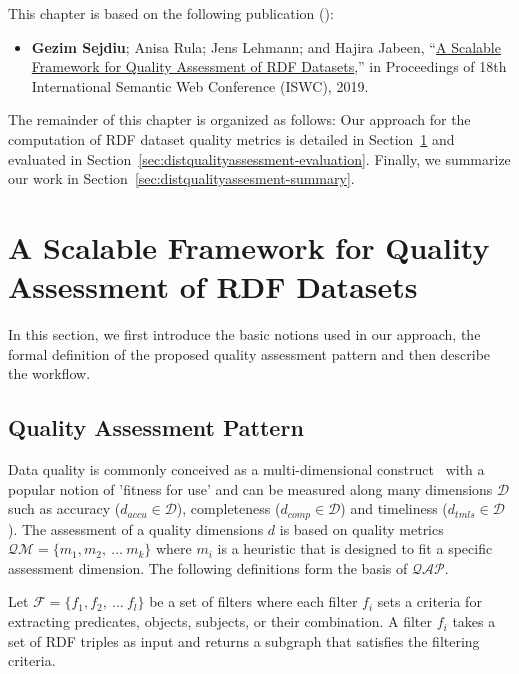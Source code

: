 This chapter is based on the following publication (\cite{sejdiu-2019-sansa-dist-quality-assessment-iswc}):
\begin{itemize}
     \item \textbf{Gezim Sejdiu}; Anisa Rula; Jens Lehmann; and Hajira Jabeen, “\href{http://jens-lehmann.org/files/2019/iswc_dist_quality_assessment.pdf}{A Scalable Framework for Quality Assessment of RDF Datasets},” in Proceedings of 18th International Semantic Web Conference (ISWC), 2019.
\end{itemize}

The remainder of this chapter is organized as follows:
Our approach for the computation of \gls{RDF} dataset quality metrics is detailed in Section~\ref{sec:distqualityassessment-approach} and evaluated in Section~\ref{sec:distqualityassessment-evaluation}.
Finally, we summarize our work in  Section~\ref{sec:distqualityassesment-summary}.

\section{A Scalable Framework for Quality Assessment of RDF Datasets}
\label{sec:distqualityassessment-approach}
In this section, we first introduce the basic notions used in our approach, the formal definition of the proposed quality assessment pattern and then describe the workflow. 

\subsection{Quality Assessment Pattern}
Data quality is commonly conceived as a multi-dimensional construct~\cite{BatiniS16} with a popular notion of 'fitness for use' and can be measured along many dimensions $\mathcal{D}$ such as accuracy ($d_{accu} \in \mathcal{D}$), completeness ($d_{comp} \in \mathcal{D}$) and timeliness ($d_{tmls} \in \mathcal{D}$). 
The assessment of a quality dimensions $d$ is based on quality metrics $\mathcal{QM} = \{m_1,m_2,~\dots~m_k\}$ where $m_i$ is a heuristic that is designed to fit a specific assessment dimension. 
The following definitions form the basis of $\mathcal{QAP}$.

\begin{definition}[Filter]
Let $\mathcal{F} = \{f_1,f_2,~\dots~f_l\}$ be a set of filters where each filter $f_i$ sets a criteria for extracting predicates, objects, subjects, or their combination.
A filter $f_i$ takes a set of \gls{RDF} triples as input and returns a subgraph that satisfies the filtering criteria.
\end{definition}


